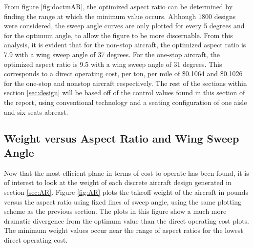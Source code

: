 \documentclass{article}
\begin{document}
        \begin{flushleft}
            From figure \ref{fig:doctmAR}, the optimized aspect ratio can be
            determined by finding the range at which the minimum value occurs.
            Although 1800 designs were considered, the sweep angle curves are
            only plotted for every 5 degrees and for the optimum angle, to allow
            the figure to be more discernable. From this analysis, it is evident
            that for the non-stop aircraft, the optimized aspect ratio is 7.9
            with a wing sweep angle of 37 degrees. For the one-stop aircraft,
            the optimized aspect ratio is 9.5 with a wing sweep angle of 31
            degrees. This corresponds to a direct operating cost, per ton, per
            mile of \$0.1064 and \$0.1026 for the one-stop and nonstop aircraft
            respectively. The rest of the sections within section
            \ref{sec:design} will be based off of the control values found in
            this section of the report, using conventional technology and a
            seating configuration of one aisle and six seats abreast.
        \end{flushleft}

    \subsection{Weight versus Aspect Ratio and Wing Sweep Angle}
    \label{sec:weight}
        \begin{flushleft}
            Now that the most efficient plane in terms of cost to operate has
            been found, it is of interest to look at the weight of each discrete
            aircraft design generated in section \ref{sec:AR}. Figure
            \ref{fig:AR} plots the takeoff weight of the aircraft in pounds
            versus the aspect ratio using fixed lines of sweep angle, using the
            same plotting scheme as the previous section. The plots in this
            figure show a much more dramatic divergence from the optimum value
            than the direct operating cost plots. The minimum weight values
            occur near the range of aspect ratios for the lowest direct
            operating cost.
        \end{flushleft}
\end{document}
